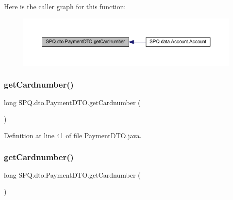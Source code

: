 Here is the caller graph for this function\+:
\nopagebreak
\begin{figure}[H]
\begin{center}
\leavevmode
\includegraphics[width=350pt]{class_s_p_q_1_1dto_1_1_payment_d_t_o_ac2a8a2ab315f3027f25780a84da0b824_icgraph}
\end{center}
\end{figure}
\mbox{\label{class_s_p_q_1_1dto_1_1_payment_d_t_o_ac2a8a2ab315f3027f25780a84da0b824}} 
\subsubsection{\texorpdfstring{get\+Cardnumber()}{getCardnumber()}\hspace{0.1cm}{\footnotesize\ttfamily [2/3]}}
{\footnotesize\ttfamily long S\+P\+Q.\+dto.\+Payment\+D\+T\+O.\+get\+Cardnumber (\begin{DoxyParamCaption}{ }\end{DoxyParamCaption})}



Definition at line 41 of file Payment\+D\+T\+O.\+java.

\mbox{\label{class_s_p_q_1_1dto_1_1_payment_d_t_o_ac2a8a2ab315f3027f25780a84da0b824}} 
\subsubsection{\texorpdfstring{get\+Cardnumber()}{getCardnumber()}\hspace{0.1cm}{\footnotesize\ttfamily [3/3]}}
{\footnotesize\ttfamily long S\+P\+Q.\+dto.\+Payment\+D\+T\+O.\+get\+Cardnumber (\begin{DoxyParamCaption}{ }\end{DoxyParamCaption})}




